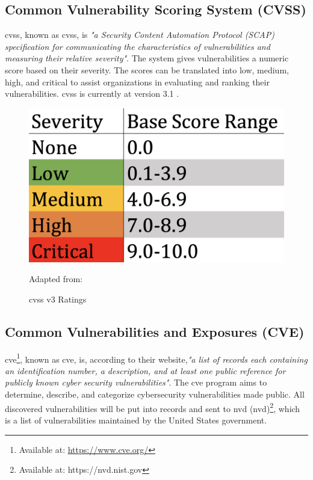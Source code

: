 \subsection{Common Vulnerability Scoring System (CVSS)}
\acrlong{cvss}, known as \acrshort{cvss}, is \textit{"a Security Content Automation Protocol (SCAP) specification for communicating the characteristics of vulnerabilities and measuring their relative severity"}\cite{nistCVSS}. The system gives vulnerabilities a numeric score based on their severity. The scores can be translated into low, medium, high, and critical to assist organizations in evaluating and ranking their vulnerabilities. \acrshort{cvss} is currently at version 3.1 \cite{CVSS}.

\begin{figure}[H]
    \centering
    \includegraphics[scale=0.3]{Images/CVSS.png}
    \caption{\acrshort{cvss} v3 Ratings} Adapted from: \cite{cvssrating}
    \label{fig:CVSS v3 Ratings}
\end{figure}

\subsection{Common Vulnerabilities and Exposures (CVE)}
\label{Common Vulnerabilities and Exposures}
\acrlong{cve}\footnote{Available at: \url{https://www.cve.org/}}, known as \acrshort{cve}, is, according to their website,\textit{"a list of records each containing an identification number, a description, and at least one public reference for publicly known cyber security vulnerabilities"}\cite{CVE}. The \acrshort{cve} program aims to determine, describe, and categorize cybersecurity vulnerabilities made public. All discovered vulnerabilities will be put into records and sent to \acrlong{nvd} (\acrshort{nvd})\footnote{Available at: https://nvd.nist.gov}, which is a list of vulnerabilities maintained by the United States government.

